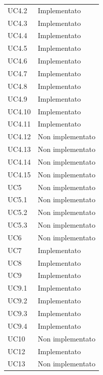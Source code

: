 \begin{longtable} {
            >{\centering}p{64.5mm} 
            >{}p{64.5mm}
            }
            UC4.2 & Implementato \TBstrut \\ [2mm]
            UC4.3 & Implementato \TBstrut \\ [2mm]
            UC4.4 & Implementato \TBstrut \\ [2mm]
            UC4.5 & Implementato \TBstrut \\ [2mm]
            UC4.6 & Implementato \TBstrut \\ [2mm]
            UC4.7 & Implementato \TBstrut \\ [2mm]
            UC4.8 & Implementato \TBstrut \\ [2mm]
            UC4.9 & Implementato \TBstrut \\ [2mm]
            UC4.10 & Implementato \TBstrut \\ [2mm]
            UC4.11 & Implementato \TBstrut \\ [2mm]
            UC4.12 & Non implementato \TBstrut \\ [2mm]
            UC4.13 & Non implementato \TBstrut \\ [2mm]
            UC4.14 & Non implementato \TBstrut \\ [2mm]
            UC4.15 & Non implementato \TBstrut \\ [2mm]
            UC5 & Non implementato \TBstrut \\ [2mm]
            UC5.1 & Non implementato \TBstrut \\ [2mm]
            UC5.2 & Non implementato \TBstrut \\ [2mm]
            UC5.3 & Non implementato \TBstrut \\ [2mm]
            UC6 & Non implementato \TBstrut \\ [2mm]
            UC7 & Implementato \TBstrut \\ [2mm]
            UC8 & Implementato \TBstrut \\ [2mm]
            UC9 & Implementato \TBstrut \\ [2mm]
            UC9.1 & Implementato \TBstrut \\ [2mm]
            UC9.2 & Implementato \TBstrut \\ [2mm]
            UC9.3 & Implementato \TBstrut \\ [2mm]
            UC9.4 & Implementato \TBstrut \\ [2mm]
            UC10 & Non implementato \TBstrut \\ [2mm]
            UC12 & Implementato \TBstrut \\ [2mm]
            UC13 & Non implementato \TBstrut \\ [2mm]

\end{longtable}
